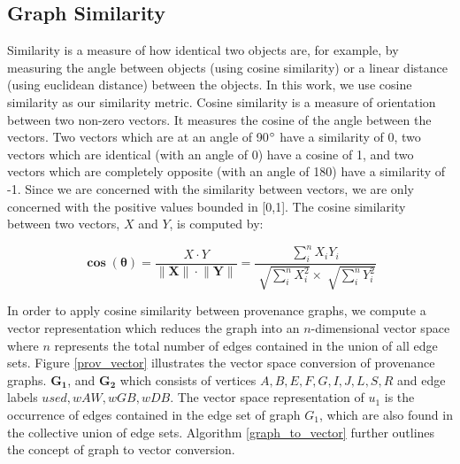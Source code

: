 \subsection{Graph Similarity} \label{similarity}
Similarity is a measure of how identical two objects are, for example, by measuring the angle between objects (using cosine similarity) or a linear distance (using euclidean distance) between the objects. In this work, we use cosine similarity as our similarity metric. Cosine similarity is a measure of orientation between two non-zero vectors. It measures the cosine of the angle between the vectors. Two vectors which are at an angle of 90$\degree$ have a similarity of 0, two vectors which are identical (with an angle of 0\degree) have a cosine of 1, and two vectors which are completely opposite (with an angle of 180\degree) have a similarity of -1. Since we are concerned with the similarity between vectors, we are only concerned with the positive values bounded in [0,1]. The cosine similarity between two vectors, $X$ and $Y$, is computed by:

\[\mathbf{\cos{(\theta)}} = \dfrac{X \cdot  Y}{ \lVert \mathbf{X} \rVert \cdot \lVert \mathbf{Y} \rVert} =\dfrac{\sum_{i}^n X_i Y_i }{\sqrt[]{\sum_{i}^n X_i^2} \times \sqrt[]{\sum_{i}^n Y_i^2}}  \]



\par In order to apply cosine similarity between provenance graphs, we compute a vector representation which reduces the graph into an $n$-dimensional vector space where $n$ represents the total number of edges contained in the union of all edge sets. Figure \ref{prov_vector} illustrates the vector space conversion of provenance graphs. $\boldsymbol{G_1}$, and $\boldsymbol{G_2}$ which consists of vertices $A,B,E,F,G, I, J, L, S, R$ and edge labels $used, wAW, wGB, wDB$. The vector space representation of $u_1$ is the occurrence of edges contained in the edge set of graph $G_1$, which  are also found in the collective union of edge sets. Algorithm \ref{graph_to_vector} further outlines the concept of graph to vector conversion.

